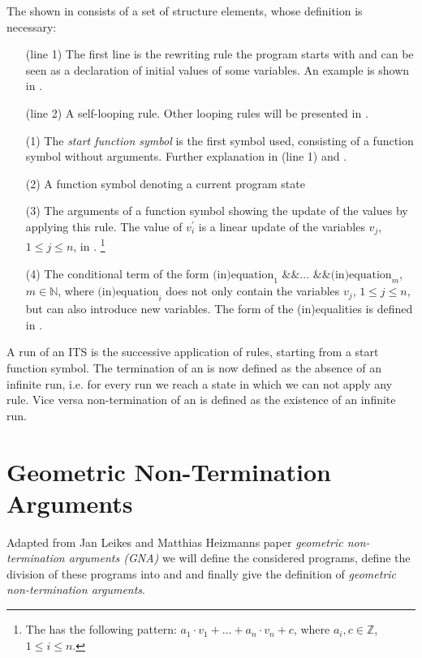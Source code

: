 The \its shown in  consists of a set of structure elements, whose definition is necessary:
\begin{enumerate}[leftmargin=1]
	\item[(line 1)] The first line is the rewriting rule the program starts with and can be seen as a declaration of initial values of some variables. An example is shown in .
	\item[(line 2)] A self-looping rule. Other looping rules will be presented in .
	\item[(1)] The \textit{start function symbol} is the first symbol used, consisting of a function symbol without arguments. Further explanation in (line 1) and .
	\item[(2)] A function symbol denoting a current program state
	\item[(3)] The arguments of a function symbol showing the update of the values by applying this rule. The value of $v^\prime_i$ is a linear update of the variables $v_j$, $1 \le j \le n$, in \stdLinInt. \footnote{The \stdLinInt has the following pattern: $ a_1\cdot v_1 + \dots + a_n\cdot v_n + c$, where $a_i , c \in \mathbb{Z}$, $1 \le i\le n$.  }
	\item[(4)] The conditional term of the form $\text{(in)equation}_1 \text{ \&\& } \dots \text{ \&\& } \text{(in)equation}_m$, $m \in \mathbb{N}$, where $\text{(in)equation}_i$ does not only contain the variables $v_j$, $1 \le j \le n$, but can also introduce new variables. The form of the (in)equalities is defined in .	
\end{enumerate} 

A run of an ITS is the successive application of rules, starting from a start function symbol.
The termination of an \its is now defined as the absence of an infinite run, i.e. for every run we reach a state in which we can not apply any rule. Vice versa non-termination of an \its is defined as the existence of an infinite run.


\section{Geometric Non-Termination Arguments}
Adapted from Jan Leikes and Matthias Heizmanns paper \textit{geometric non-termination arguments (GNA)} \cite{leike2014geometric} we will define the considered programs, define the division of these programs into \stem and \loopt and finally give the definition of \textit{geometric non-termination arguments}.

